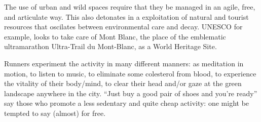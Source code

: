 The use of urban and wild spaces require that they be managed in an agile,
free, and articulate way. This also detonates in a exploitation of natural
and tourist resources that oscilates between environmental care and decay.
UNESCO for example, looks to take care of Mont Blanc, the place of the
emblematic ultramarathon Ultra-Trail du Mont-Blanc, as a World Heritage
Site.


Runners experiment the activity in many different manners: as meditation
in motion, to listen to music, to eliminate some colesterol from blood, to
experience the vitality of their body/mind, to clear their head and/or gaze at
the green landscape anywhere in the city. “Just buy a good pair of shoes and
you’re ready” say those who promote a less sedentary and quite cheap activity:
one might be tempted to say (almost) for free.

